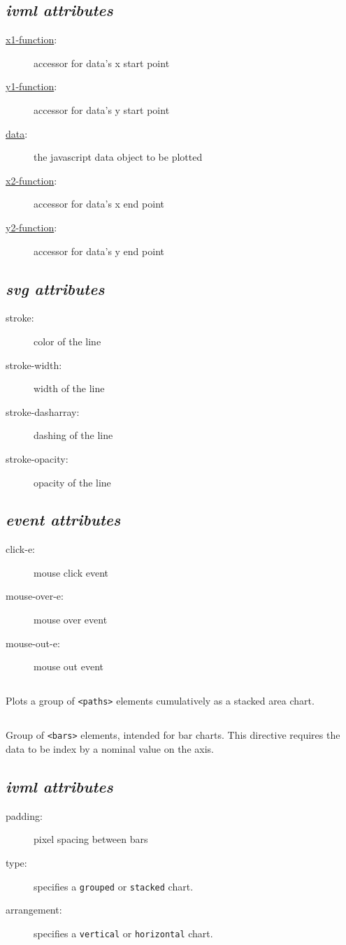 \subsection*{\emph{ivml attributes}}
\begin{description}
\item[\uline{x1-function}:]{accessor for data's x start point}
\item[\uline{y1-function}:]{accessor for data's y start point}
\item[\uline{data}:]{the javascript data object to be plotted}
\item[\uline{x2-function}:]{accessor for data's x end point}
\item[\uline{y2-function}:]{accessor for data's y end point}
\end{description}
\subsection*{\emph{svg attributes}}
\begin{description}
\item[stroke:]{color of the line}
\item[stroke-width:]{width of the line}
\item[stroke-dasharray:]{dashing of the line}
\item[stroke-opacity:]{opacity of the line}
\end{description}
\subsection*{\emph{event attributes}}
\begin{description}
\item[click-e:]{mouse click event}
\item[mouse-over-e:]{mouse over event}
\item[mouse-out-e:]{mouse out event}
\end{description}
\clearpage \noindent \hrulefill
\subsection*{{\tt <line-group>}}
\hrulefill\newline
 Plots a group of {\tt <paths>} elements cumulatively as a stacked area chart.
\clearpage \noindent \hrulefill
\subsection*{{\tt <bar-group>}}
\hrulefill\newline
 Group of {\tt <bars>} elements, intended for bar charts. This directive requires the data to be index by a nominal value on the axis.
\subsection*{\emph{ivml attributes}}
\begin{description}
\item[padding:]{pixel spacing between bars}
\item[type:]{specifies a {\tt grouped} or {\tt stacked} chart.}
\item[arrangement:]{specifies a {\tt vertical} or {\tt horizontal} chart.}
\end{description}
